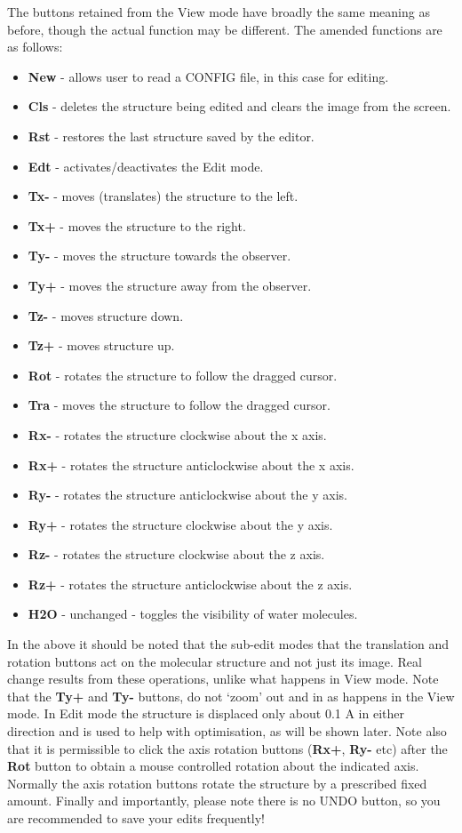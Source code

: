 The buttons retained from the View mode have broadly the same meaning as
before, though the actual function may be different. The amended functions are
as follows:
\begin{itemize}
\item {\bf New} - allows user to read a CONFIG file, in this case for editing.
\item {\bf Cls} - deletes the structure being edited and clears the image from
  the screen.
\item {\bf Rst} - restores the last structure saved by the editor.
\item {\bf Edt} - activates/deactivates the Edit mode.
\item {\bf Tx-} - moves (translates) the structure to the left.
\item {\bf Tx+} - moves the structure to the right.
\item {\bf Ty-} - moves the structure towards the observer.
\item {\bf Ty+} - moves the structure away from the observer.
\item {\bf Tz-} - moves structure down.
\item {\bf Tz+} - moves structure up.
\item {\bf Rot} - rotates the structure to follow the dragged cursor.
\item {\bf Tra} - moves the structure to follow the dragged cursor.
\item {\bf Rx-} - rotates the structure clockwise about the x axis.
\item {\bf Rx+} - rotates the structure anticlockwise about the x axis.
\item {\bf Ry-} - rotates the structure anticlockwise about the y axis.
\item {\bf Ry+} - rotates the structure clockwise about the y axis.
\item {\bf Rz-} - rotates the structure clockwise about the z axis.
\item {\bf Rz+} - rotates the structure anticlockwise about the z axis.
\item {\bf H2O} - unchanged - toggles the visibility of water molecules.
\end{itemize}

In the above it should be noted that the sub-edit modes that the translation
and rotation buttons act on the molecular structure and not just its image.
Real change results from these operations, unlike what happens in View mode.
Note that the {\bf Ty+} and {\bf Ty-} buttons, do not `zoom' out and in as
happens in the View mode. In Edit mode the structure is displaced only about
0.1 A in either direction and is used to help with optimisation, as will be
shown later. Note also that it is permissible to click the axis rotation
buttons ({\bf Rx+}, {\bf Ry-} etc) after the {\bf Rot} button to obtain a
mouse controlled rotation about the indicated axis. Normally the axis rotation
buttons rotate the structure by a prescribed fixed amount. Finally and
importantly, please note there is no UNDO button, so you are recommended to
save your edits frequently!

